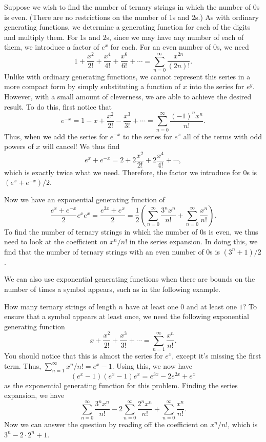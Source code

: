 \begin{example}
  Suppose we wish to find the number of ternary strings in which the
  number of $0$s is even. (There are no restrictions on the number of
  $1$s and $2$s.) As with ordinary generating functions, we determine
  a generating function for each of the digits and multiply them. For
  $1$s and $2$s, since we may have any number of each of them, we
  introduce a factor of $e^x$ for each. For an even number of $0$s,
  we need
  \[1 + \frac{x^2}{2!} + \frac{x^4}{4!} + \frac{x^6}{6!} + \cdots =
  \sum_{n=0}^\infty \frac{x^{2n}}{(2n)!}.\]
  Unlike with ordinary generating functions, we cannot represent this
  series in a more compact form by simply substituting a function of
  $x$ into the series for $e^y$. However, with a small amount of
  cleverness, we are able to achieve the desired result. To do this,
  first notice that
  \[e^{-x} = 1 - x + \frac{x^2}{2!} - \frac{x^3}{3!} + \cdots =
  \sum_{n=0}^\infty \frac{(-1)^nx^n}{n!}.\]
  Thus, when we add the series for $e^{-x}$ to the series for $e^x$
  all of the terms with odd powers of $x$ will cancel! We thus find
  \[e^x+e^{-x} = 2+2\frac{x^2}{2!} + 2\frac{x^4}{4!} + \cdots,\]
  which is exactly twice what we need. Therefore, the factor we introduce
  for $0$s is $(e^x+e^{-x})/2$.

  Now we have an exponential generating function of 
  \[\frac{e^x+e^{-x}}{2}e^x e^x = \frac{e^{3x} + e^x}{2} =
  \frac{1}{2}\left(\sum_{n=0}^\infty \frac{3^nx^n}{n!} +
    \sum_{n=0}^\infty \frac{x^n}{n!}\right).\] To find the number of
  ternary strings in which the number of $0$s is even, we thus need to
  look at the coefficient on $x^n/n!$ in the series expansion. In
  doing this, we find that the number of ternary strings with an even
  number of $0$s is $(3^n+1)/2$.
\end{example}

We can also use exponential generating functions when there are bounds
on the number of times a symbol appears, such as in the following
example.

\begin{example}
  How many ternary strings of length $n$ have at least one $0$ and at
  least one $1$?  To ensure that a symbol appears at least once, we
  need the following exponential generating function
  \[x+\frac{x^2}{2!} + \frac{x^3}{3!} + \cdots = \sum_{n=1}^\infty
  \frac{x^n}{n!}.\] You should notice that this is almost the series
  for $e^x$, except it's missing the first term. Thus,
  $\sum_{n=1}^\infty x^n/n! = e^x-1$. Using this, we now have 
  \[(e^x-1)(e^x-1)e^x=e^{3x}-2e^{2x}+e^x\] as the exponential
  generating function for this problem.  Finding the series expansion,
  we have
  \[\sum_{n=0}^\infty \frac{3^nx^n}{n!} - 2\sum_{n=0}^\infty
  \frac{2^nx^n}{n!} + \sum_{n=0}^\infty \frac{x^n}{n!}.\]
  Now we can answer the question by reading off the coefficient on
  $x^n/n!$, which is $3^n - 2\cdot 2^n + 1$.
\end{example}

